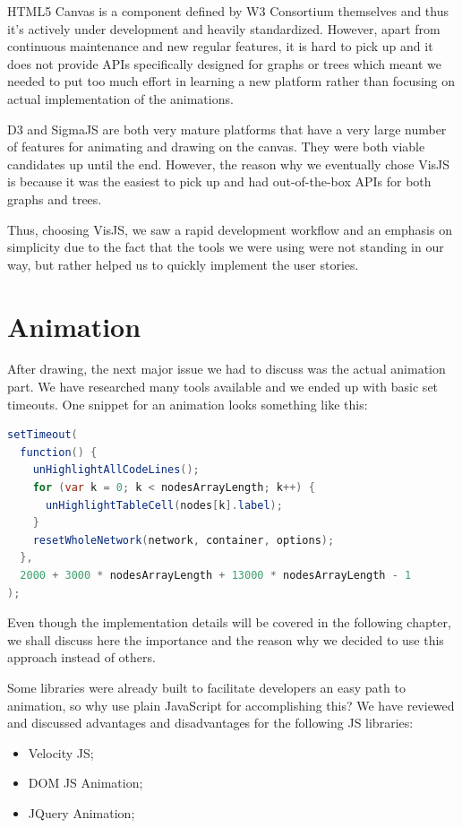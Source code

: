 \documentclass{l4proj}
\begin{document}
HTML5 Canvas is a component defined by W3 Consortium themselves and thus it's actively under development and heavily
standardized. However, apart from continuous maintenance and new regular features, it is hard to pick up and it does
not provide APIs specifically designed for graphs or trees which meant we needed to put too much effort in learning a
new platform rather than focusing on actual implementation of the animations.

D3 and SigmaJS are both very mature platforms that have a very large number of features for animating and drawing on
the canvas. They were both viable candidates up until the end. However, the reason why we eventually chose VisJS
is because it was the easiest to pick up and had out-of-the-box APIs for both graphs and trees. 

Thus, choosing VisJS, we saw a rapid development workflow and an emphasis on simplicity due to the fact that the tools
we were using were not standing in our way, but rather helped us to quickly implement the user stories.

\section{Animation}

After drawing, the next major issue we had to discuss was the actual animation part. We have researched many tools
available and we ended up with basic set timeouts. One snippet for an animation looks something like this:

\begin{lstlisting}[language=Java, caption=JavaScript snippet for creating an animation]
setTimeout(
  function() {
    unHighlightAllCodeLines();
    for (var k = 0; k < nodesArrayLength; k++) {
      unHighlightTableCell(nodes[k].label);
    }
    resetWholeNetwork(network, container, options);
  },
  2000 + 3000 * nodesArrayLength + 13000 * nodesArrayLength - 1
);
\end{lstlisting}

Even though the implementation details will be covered in the following chapter, we shall discuss here the importance
and the reason why we decided to use this approach instead of others.

Some libraries were already built to facilitate developers an easy path to animation, so why use plain JavaScript for
accomplishing this? We have reviewed and discussed advantages and disadvantages for the following JS libraries:

\begin{itemize}
    \item Velocity JS;
    \item DOM JS Animation;
    \item JQuery Animation;
\end{itemize}
\end{document}
